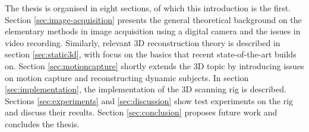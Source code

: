The thesis is organised in eight sections, of which this introduction is the first.
Section \ref{sec:image-acquisition} presents the general theoretical background on the elementary methods in image acquisition using a digital camera and the issues in video recording.
Similarly, relevant 3D reconstruction theory is described in section \ref{sec:static3d}, with focus on the basics that recent state-of-the-art builds on.
Section \ref{sec:motioncapture} shortly extends the 3D topic by introducing issues on motion capture and reconstructing dynamic subjects.
In section \ref{sec:implementation}, the implementation of the 3D scanning rig is described.
Sections \ref{sec:experiments} and \ref{sec:discussion} show test experiments on the rig and discuss their results.
Section \ref{sec:conclusion} proposes future work and concludes the thesis.

